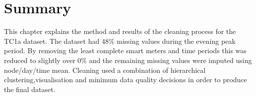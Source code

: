 \section{Summary}

This chapter explains the method and results of the cleaning process for the TC1a dataset. The dataset had 48\% missing values during the evening peak period. By removing the least complete smart meters and time periods this was reduced to slightly over 0\% and the remaining missing values were imputed using node/day/time mean. Cleaning used a combination of hierarchical clustering,visualisation and minimum data quality decisions in order to produce the final dataset.


